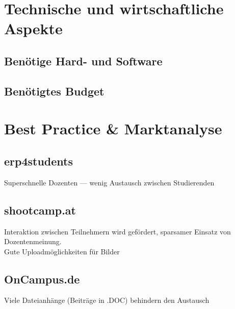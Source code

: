 

\section{Technische und wirtschaftliche Aspekte} %
\label{sec:technische_und_wirtschaftliche_aspekte}

\subsection{Benötige Hard- und Software} %
\label{sub:benotige_hard_und_software}


\subsection{Benötigtes Budget} %
\label{sub:benotigtes_budget}



\section{Best Practice \& Marktanalyse} %
\label{sec:best_practice}

\subsection{erp4students} %
\label{sub:erp4students}
Superschnelle Dozenten --- wenig Austausch zwischen Studierenden

\subsection{shootcamp.at} %
\label{sub:shootcamp_at}
Interaktion zwischen Teilnehmern wird gefördert, sparsamer Einsatz von Dozentenmeinung.\\
Gute Uploadmöglichkeiten für Bilder

\subsection{OnCampus.de} %
\label{sub:oncampus_de}
Viele Dateianhänge (Beiträge in .DOC) behindern den Austausch

